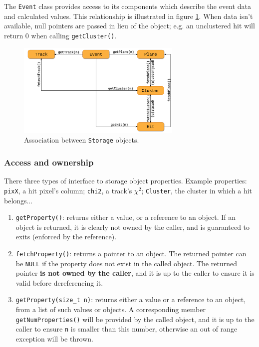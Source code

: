 \documentclass[10pt,a4paper]{book}
\begin{document}
The \Verb`Event` class provides access to its components which describe the event data and calculated values. This relationship is illustrated in figure \ref{fig:modules_storage_objects}. When data isn't available, null pointers are passed in lieu of the object; e.g. an unclustered hit will return 0 when calling \Verb`getCluster()`.

\begin{figure}[htb]
  \centering
  \includegraphics[width=0.7\textwidth]{images/modules_storage_objects.pdf}
  \caption{Association between \protect\Verb`Storage` objects.}
  \label{fig:modules_storage_objects}
\end{figure}

\subsubsection*{Access and ownership}

There three types of interface to storage object properties. Example properties: \Verb`pixX`, a hit pixel's column; \Verb`chi2`, a track's $\chi^2$; \Verb`Cluster`, the cluster in which a hit belongs...

\begin{enumerate}
	\item \Verb`getProperty()`: returns either a value, or a reference to an object. If an object is returned, it is clearly not owned by the caller, and is guaranteed to exits (enforced by the reference).
	\item \Verb`fetchProperty()`: returns a pointer to an object. The returned pointer can be \Verb`NULL` if the property does not exist in the called object. The returned pointer \textbf{is not owned by the caller}, and it is up to the caller to ensure it is valid before dereferencing it.
	\item \Verb`getProperty(size_t n)`: returns either a value or a reference to an object, from a list of such values or objects. A corresponding member \Verb`getNumProperties()` will be provided by the called object, and it is up to the caller to ensure \Verb`n` is smaller than this number, otherwise an out of range exception will be thrown.
\end{enumerate}
\end{document}
